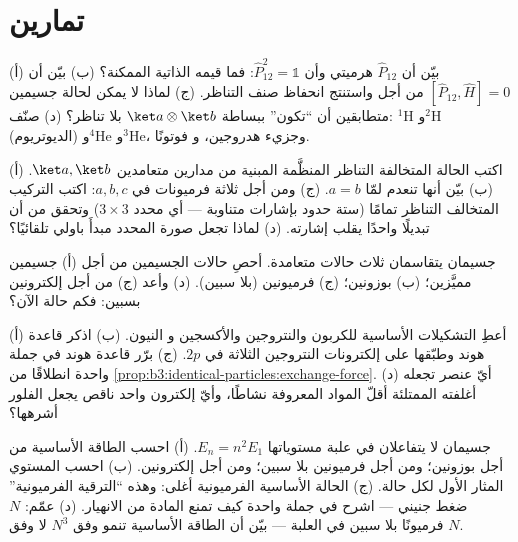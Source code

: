 \section{تمارين}

\begin{exercise}[$\star$]\label{exo:b3:identical-particles:1}
(أ) بيّن أن $\hat P_{12}$ هرميتي وأن $\hat P_{12}^2 = \mathbb 1$:
فما قيمه الذاتية الممكنة؟ (ب) بيّن أن $[\hat P_{12}, \hat H] =
0$ من أجل  واستنتج انحفاظ صنف التناظر.
(ج) لماذا لا يمكن لحالة جسيمين متطابقين أن ``تكون'' ببساطة
$\ket a\otimes\ket b$ بلا تناظر؟ (د) صنّف:
$^1$H و$^2$H (الديوتريوم) و$^4$He و$^3$He، وجزيء هدروجين، و
فوتونًا.
\end{exercise}

\begin{exercise}[$\star$]\label{exo:b3:identical-particles:2}
(أ) اكتب الحالة المتخالفة التناظر المنظَّمة المبنية من مدارين
متعامدين $\ket a, \ket b$. (ب) بيّن أنها تنعدم لمّا $a = b$. (ج)
ومن أجل ثلاثة فرميونات في $a, b, c$: اكتب التركيب المتخالف
التناظر تمامًا (ستة حدود بإشارات متناوبة --- أي محدد
$3\times3$) وتحقق من أن تبديلًا واحدًا يقلب إشارته. (د) لماذا تجعل
صورة المحدد مبدأَ باولي تلقائيًا؟
\end{exercise}

\begin{exercise}[$\star$]\label{exo:b3:identical-particles:3}
جسيمان يتقاسمان ثلاث حالات متعامدة. أحصِ حالات الجسيمين
من أجل (أ) جسيمين مميَّزين؛ (ب) بوزونين؛ (ج) فرميونين
(بلا سبين). (د) وأعد (ج) من أجل إلكترونين بسبين: فكم حالة
الآن؟
\end{exercise}

\begin{exercise}[$\star$]\label{exo:b3:identical-particles:4}
(أ) أعطِ التشكيلات الأساسية للكربون والنتروجين والأكسجين و
النيون. (ب) اذكر قاعدة هوند وطبّقها على إلكترونات النتروجين الثلاثة في $2p$.
(ج) برّر قاعدة هوند في جملة واحدة انطلاقًا من
\cref{prop:b3:identical-particles:exchange-force}. (د) أيّ
عنصر تجعله أغلفته الممتلئة أقلّ المواد المعروفة نشاطًا،
وأيّ إلكترون واحد ناقص يجعل الفلور أشرهها؟
\end{exercise}

\begin{exercise}[$\star\star$]\label{exo:b3:identical-particles:5}
جسيمان لا يتفاعلان في علبة مستوياتها $E_n = n^2E_1$.
(أ) احسب الطاقة الأساسية من أجل بوزونين؛ ومن أجل فرميونين بلا سبين؛ ومن أجل
إلكترونين. (ب) احسب المستوي المثار الأول لكل حالة. (ج) الحالة
الأساسية الفرميونية أغلى: وهذه ``الترقية الفرميونية'' ضغط
جنيني --- اشرح في جملة واحدة كيف تمنع المادة من
الانهيار. (د) عمّم: $N$ فرميونًا بلا سبين في العلبة ---
بيّن أن الطاقة الأساسية تنمو وفق $N^3$ لا وفق $N$.
\end{exercise}

